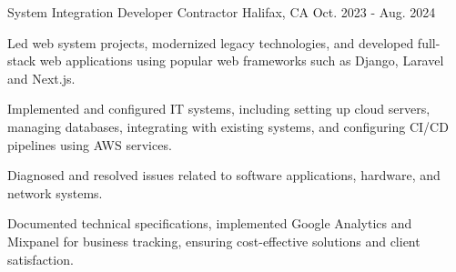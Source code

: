 \begin{cventries}
  \cventry
    {System Integration Developer} %
    {Contractor} %
    {Halifax, CA} %
    {Oct. 2023 - Aug. 2024} %
    {
      \begin{cvitems} %
        \item {Led web system projects, modernized legacy technologies, and developed full-stack web applications using popular web frameworks such as Django, Laravel and Next.js.}
        \item {Implemented and configured IT systems, including setting up cloud servers, managing databases, integrating with existing systems, and configuring CI/CD pipelines using AWS services.}
        \item {Diagnosed and resolved issues related to software applications, hardware, and network systems.}
        \item {Documented technical specifications, implemented Google Analytics and Mixpanel for business tracking, ensuring cost-effective solutions and client satisfaction.}
      \end{cvitems}
    }

\end{cventries}

